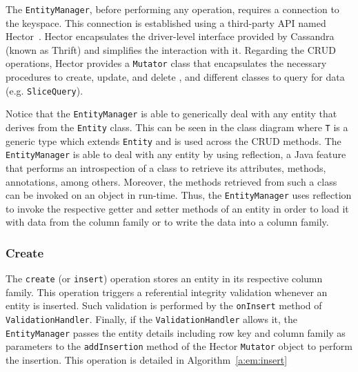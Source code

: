 	The \texttt{EntityManager},  before performing any operation,  requires a
	connection to the keyspace.  This connection is established using a third-party
	\ac{API} named Hector~\citep{hector}.  Hector  encapsulates the driver-level
	interface provided by Cassandra (known as Thrift) and simplifies the interaction
	with it.  Regarding the \ac{CRUD} operations,  Hector provides  a
	\texttt{Mutator} class that  encapsulates the necessary procedures to
	create, update, and delete , and different classes to query
	for data (e.g. \texttt{SliceQuery}).
	 
	 Notice that  the \texttt{EntityManager} is able to generically deal with any
	 entity that derives from the \texttt{Entity} class. This can be seen in the
	 class diagram where \texttt{T} is a generic type which extends \texttt{Entity} 
	 and is used across the \ac{CRUD} methods. The \texttt{EntityManager} is able
	 to deal with any entity by using reflection, a Java
	 feature that performs  an introspection of a class to retrieve its
	 attributes, methods, annotations, among others. Moreover, the
	 methods retrieved from such a class can be invoked on an object in run-time. 
	 Thus, the \texttt{EntityManager} uses reflection to invoke the respective 
	 getter and setter methods of an entity in order to load it with data
	 from the column family or to write the data into a column family.
	 
	 
	
	
	
	
	
		\subsubsection{Create}
		
		The \texttt{create} (or \texttt{insert}) operation stores an entity in its respective column family. This
		operation triggers a referential integrity validation whenever an  entity is  inserted.  Such validation is performed by
		 the \texttt{onInsert} method of \texttt{ValidationHandler}.
		  Finally, if the
 		 \texttt{ValidationHandler} allows it,  the \texttt{EntityManager} passes the
		  entity details  including row key and column family as parameters to the
		 \texttt{addInsertion} method of the Hector \texttt{Mutator} object to perform
		 the insertion. This operation is detailed in Algorithm~\ref{a:em:insert}
		 
